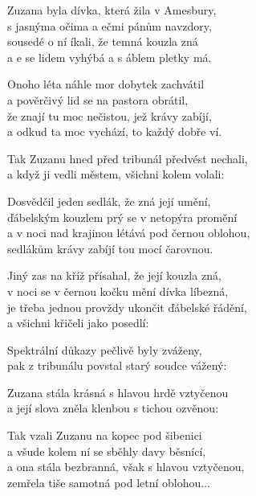 
\ve{}
Zuzana byla dívka, která žila v Amesbury, \\
s jasnýma očima a ečmi pánům navzdory, \\
sousedé o ní íkali, že temná kouzla zná \\
a e se lidem vyhýbá a s áblem pletky má. 

\ve{}
Onoho léta náhle mor dobytek zachvátil \\
a pověrčivý lid se na pastora obrátil, \\
že znají tu moc nečistou, jež krávy zabíjí, \\
a odkud ta moc vychází, to každý dobře ví. 

\ve{}
Tak Zuzanu hned před tribunál předvést nechali, \\
a když ji vedli městem, všichni kolem volali: \\

\ve{}
Dosvědčil jeden sedlák, že zná její umění, \\
ďábelským kouzlem prý se v netopýra promění \\
a v noci nad krajinou létává pod černou oblohou, \\
sedlákům krávy zabíjí tou mocí čarovnou. 

\ve{}
Jiný zas na kříž přísahal, že její kouzla zná, \\
v noci se v černou kočku mění dívka líbezná, \\
je třeba jednou provždy ukončit ďábelské řádění, \\
a všichni křičeli jako posedlí:  

\ve{}
Spektrální důkazy pečlivě byly zváženy, \\
pak z tribunálu povstal starý soudce vážený: \\

\ve{}
Zuzana stála krásná s hlavou hrdě vztyčenou \\
a její slova zněla klenbou s tichou ozvěnou: \\

\ve{}
Tak vzali Zuzanu na kopec pod šibenici \\
a všude kolem ní se sběhly davy běsnící, \\
a ona stála bezbranná, však s hlavou vztyčenou, \\
zemřela tiše samotná pod letní oblohou... 

\esong
